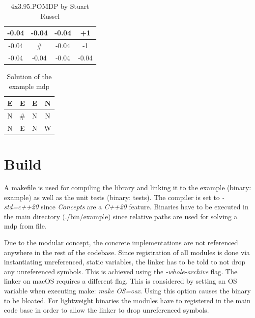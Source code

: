 \begin{table}[]
	\centering
	\begin{tabular}{|c|c|c|c|}
		\hline
		-0.04 & -0.04                      & -0.04 & \cellcolor[HTML]{9AFF99}+1 \\ \hline
		-0.04 & \cellcolor[HTML]{C0C0C0}\# & -0.04 & \cellcolor[HTML]{FFCCC9}-1 \\ \hline
		-0.04 & -0.04                      & -0.04 & -0.04                      \\ \hline
	\end{tabular}
	\caption{4x3.95.POMDP by Stuart Russel}
	\label{maze}
\end{table}


\begin{table}[]
	\centering
	\begin{tabular}{|c|c|c|c|}
		\hline
		E & E                          & E & \cellcolor[HTML]{9AFF99}N \\ \hline
		N & \cellcolor[HTML]{C0C0C0}\# & N & \cellcolor[HTML]{FFCCC9}N \\ \hline
		N & E                          & N & W                         \\ \hline
	\end{tabular}
	\caption{Solution of the example mdp}
	\label{mazesolution}
\end{table}

\section{Build}
\label{build}

A makefile is used for compiling the library and linking it to the example (binary: example) as well as the unit tests (binary: tests). The compiler is set to \emph{-std=c++20} since \emph{Concepts} are a \emph{C++20} feature. Binaries have to be executed in the main directory (./bin/example) since relative paths are used for solving a mdp from file. 

Due to the modular concept, the concrete implementations are not referenced anywhere in the rest of the codebase. Since registration of all modules is done via instantiating unreferenced, static variables, the linker has to be told to not drop any unreferenced symbols. This is achieved using the \emph{-whole-archive} flag. The linker on macOS requires a different flag. This is considered by setting an OS variable when executing make: \emph{make OS=osx}. Using this option causes the binary to be bloated. For lightweight binaries the modules have to registered in the main code base in order to allow the linker to drop unreferenced symbols. 


